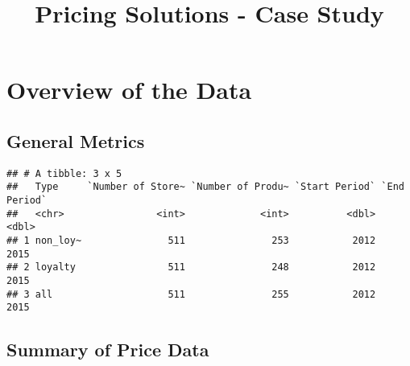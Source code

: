\documentclass[]{article}
\title{Pricing Solutions - Case Study}
\author{}
\date{}
\newenvironment{Shaded}{\begin{snugshade}}{\end{snugshade}}
\newcommand{\KeywordTok}[1]{\textcolor[rgb]{0.13,0.29,0.53}{\textbf{#1}}}
\newcommand{\DataTypeTok}[1]{\textcolor[rgb]{0.13,0.29,0.53}{#1}}
\newcommand{\StringTok}[1]{\textcolor[rgb]{0.31,0.60,0.02}{#1}}
\newcommand{\ControlFlowTok}[1]{\textcolor[rgb]{0.13,0.29,0.53}{\textbf{#1}}}
\newcommand{\OperatorTok}[1]{\textcolor[rgb]{0.81,0.36,0.00}{\textbf{#1}}}
\newcommand{\NormalTok}[1]{#1}
\begin{document}
\maketitle

\section{Overview of the Data}\label{overview-of-the-data}

\subsection{General Metrics}\label{general-metrics}

\begin{Shaded}
\end{Shaded}

\begin{verbatim}
## # A tibble: 3 x 5
##   Type     `Number of Store~ `Number of Produ~ `Start Period` `End Period`
##   <chr>                <int>             <int>          <dbl>        <dbl>
## 1 non_loy~               511               253           2012         2015
## 2 loyalty                511               248           2012         2015
## 3 all                    511               255           2012         2015
\end{verbatim}

\subsection{Summary of Price Data}\label{summary-of-price-data}
\end{document}
